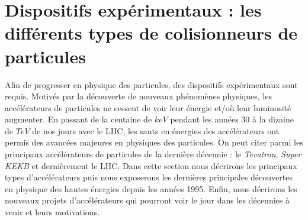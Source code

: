   
  \section{Dispositifs exp\'erimentaux : les diff\'erents types de colisionneurs de particules}
  
  Afin de progresser en physique des particules, des dispositifs exp\'erimentaux sont requis. Motiv\'es par la d\'ecouverte de nouveaux ph\'enom\`enes physiques, les acc\'el\'erateurs de particules ne cessent de voir leur \'energie et/o\`u leur luminosit\'e augmenter. En passant de la centaine de $keV$ pendant les ann\'ees 30 \`a la dizaine de $TeV$ de nos jours avec le LHC, les sauts en énergies des acc\'el\'erateurs ont permis des avanc\'ees  majeures en physiques des particules. On peut citer parmi les principaux acc\'el\'erateurs de particules de la derni\`ere d\'ecennie : le \textit{Tevatron}, \textit{Super KEKB} et derni\`erement le LHC. Dans cette section nous d\'ecrirons les principaux types d'acc\'el\'erateurs puis nous exposerons les derni\`eres principales d\'ecouvertes en physique des hautes \'energies depuis les ann\'ees 1995. Enfin, nous d\'ecrirons les nouveaux projets d'acc\'el\'erateurs qui pourront voir le jour dans les d\'ecennies \`a venir et leurs motivations.

% 
%   
% 
%   
% 
  
